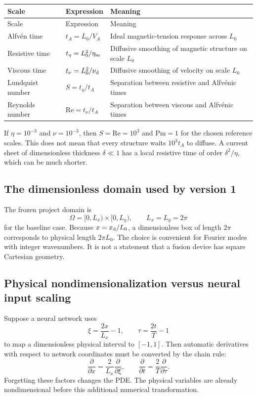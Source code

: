 \documentclass[11pt]{article}
\begin{document}
\begin{longtable}{p{}p{}p{}}
\toprule
Scale & Expression & Meaning \\
\midrule
\endfirsthead
\toprule
Scale & Expression & Meaning \\
\midrule
\endhead
Alfv\'en time & $t_A=L_0/V_A$ & Ideal magnetic-tension response across $L_0$ \\
Resistive time & $t_\eta=L_0^2/\eta_{\rm m}$ & Diffusive smoothing of magnetic structure on scale $L_0$ \\
Viscous time & $t_\nu=L_0^2/\nu_{\rm d}$ & Diffusive smoothing of velocity on scale $L_0$ \\
Lundquist number & $S=t_\eta/t_A$ & Separation between resistive and Alfv\'enic times \\
Reynolds number & $\mathrm{Re}=t_\nu/t_A$ & Separation between viscous and Alfv\'enic times \\
\bottomrule
\end{longtable}

If $\eta=10^{-3}$ and $\nu=10^{-3}$, then $S=\mathrm{Re}=10^3$ and $\mathrm{Pm}=1$ for the chosen reference scales. This does not mean that every structure waits $10^3t_A$ to diffuse. A current sheet of dimensionless thickness $\delta\ll1$ has a local resistive time of order $\delta^2/\eta$, which can be much shorter.

\subsection{The dimensionless domain used by version 1}

The frozen project domain is
\begin{equation}
\Omega=[0,L_x)\times[0,L_y),
\qquad L_x=L_y=2\pi
\end{equation}
for the baseline case. Because $x=x_{\rm d}/L_0$, a dimensionless box of length $2\pi$ corresponds to physical length $2\pi L_0$. The choice is convenient for Fourier modes with integer wavenumbers. It is not a statement that a fusion device has square Cartesian geometry.

\subsection{Physical nondimensionalization versus neural input scaling}

Suppose a neural network uses
\begin{equation}
\xi=\frac{2x}{L_x}-1,
\qquad
\tau=\frac{2t}{T}-1
\end{equation}
to map a dimensionless physical interval to $[-1,1]$. Then automatic derivatives with respect to network coordinates must be converted by the chain rule:
\begin{equation}
\frac{\partial}{\partial x}
=\frac{2}{L_x}\frac{\partial}{\partial\xi},
\qquad
\frac{\partial}{\partial t}
=\frac{2}{T}\frac{\partial}{\partial\tau}.
\end{equation}
Forgetting these factors changes the PDE. The physical variables are already nondimensional before this additional numerical transformation.
\end{document}
